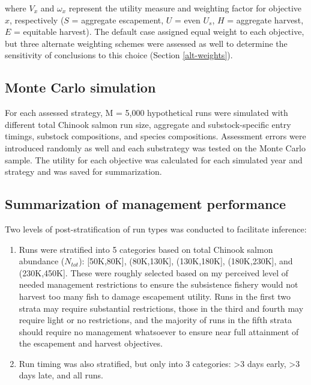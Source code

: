 \documentclass[12pt,]{book}
\theoremstyle{definition}
\theoremstyle{definition}
\theoremstyle{definition}
\theoremstyle{remark}
\begin{document}
\noindent
where \(V_x\) and \(\omega_x\) represent the utility measure and
weighting factor for objective \(x\), respectively (\(S\) = aggregate
escapement, \(U\) = even \(U_s\), \(H\) = aggregate harvest, \(E\) =
equitable harvest). The default case assigned equal weight to each
objective, but three alternate weighting schemes were assessed as well
to determine the sensitivity of conclusions to this choice (Section
\ref{alt-weights}).

\subsection{Monte Carlo simulation}\label{monte-carlo-simulation}

\noindent
For each assessed strategy, M = 5,000 hypothetical runs were simulated
with different total Chinook salmon run size, aggregate and
substock-specific entry timings, substock compositions, and species
compositions. Assessment errors were introduced randomly as well and
each substrategy was tested on the Monte Carlo sample. The utility for
each objective was calculated for each simulated year and strategy and
was saved for summarization.

\subsection{Summarization of management
performance}\label{summarization-of-management-performance}

\noindent
Two levels of post-stratification of run types was conducted to
facilitate inference:

\begin{enumerate}
\def\labelenumi{(\arabic{enumi})}
\item
  Runs were stratified into 5 categories based on total Chinook salmon
  abundance (\(N_{tot}\)): {[}50K,80K{]}, (80K,130K{]}, (130K,180K{]},
  (180K,230K{]}, and (230K,450K{]}. These were roughly selected based on
  my perceived level of needed management restrictions to ensure the
  subsistence fishery would not harvest too many fish to damage
  escapement utility. Runs in the first two strata may require
  substantial restrictions, those in the third and fourth may require
  light or no restrictions, and the majority of runs in the fifth strata
  should require no management whatsoever to ensure near full attainment
  of the escapement and harvest objectives.
\item
  Run timing was also stratified, but only into 3 categories:
  \textgreater{}3 days early, \textgreater{}3 days late, and all runs.
\end{enumerate}
\end{document}
